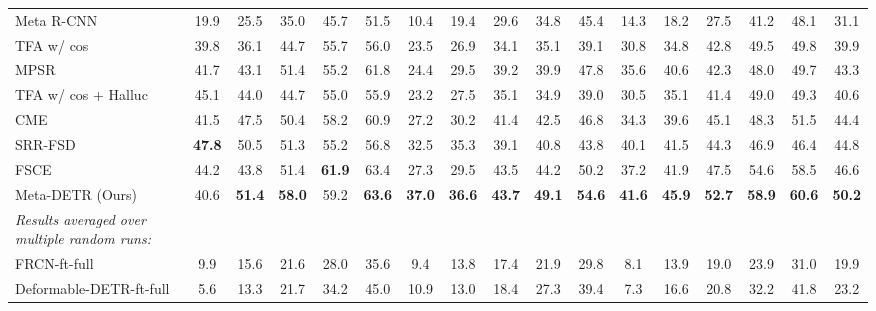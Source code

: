 \documentclass[letterpaper]{article} \usepackage{aaai22}  \usepackage{times}  \usepackage{helvet}  \usepackage{courier}  \usepackage[hyphens]{url}  \usepackage{graphicx} \urlstyle{rm} \def\UrlFont{\rm}  \usepackage{natbib}  \usepackage{caption} \DeclareCaptionStyle{ruled}{labelfont=normalfont,labelsep=colon,strut=off} \frenchspacing  \setlength{\pdfpagewidth}{8.5in}  \setlength{\pdfpageheight}{11in}  \usepackage{algorithm}
\begin{document}
\begin{table*}[t]
\begin{center}
{\begin{tabular}[t]{l|ccccc|ccccc|ccccc|c}
Meta R-CNN\;\cite{metarcnn} & 19.9 & 25.5 & 35.0 & 45.7 & 51.5 & 10.4 & 19.4 & 29.6 & 34.8 & 45.4 & 14.3 & 18.2 & 27.5 & 41.2 & 48.1 & 31.1 \\



TFA w/ cos\;\cite{fsdet}\, & 39.8 & 36.1 & 44.7 & 55.7 & 56.0 & 23.5 & 26.9 & 34.1 & 35.1 & 39.1 & 30.8 & 34.8 & 42.8 & 49.5 & 49.8 & 39.9 \\

MPSR\;\cite{MPSR}\, & 41.7 & 43.1 & 51.4 & 55.2 & 61.8 & 24.4 & 29.5 & 39.2 & 39.9 & 47.8 & 35.6 & 40.6 & 42.3 & 48.0 & 49.7 & 43.3 \\

TFA w/ cos + Halluc\;\cite{Halluc_FSD}\, & 45.1 & 44.0 & 44.7 & 55.0 & 55.9 & 23.2 & 27.5 & 35.1 & 34.9 & 39.0 & 30.5 & 35.1 & 41.4 & 49.0 & 49.3 & 40.6 \\

CME\;\cite{CME}\, & 41.5 & 47.5 & 50.4 & 58.2 & 60.9 & 27.2 & 30.2 & 41.4 & 42.5 & 46.8 & 34.3 & 39.6 & 45.1 & 48.3 & 51.5 & 44.4 \\

SRR-FSD\;\cite{SRR-FSD}\,\, & \textbf{47.8} & 50.5 & 51.3 & 55.2 & 56.8 & 32.5 & 35.3 & 39.1 & 40.8 & 43.8 & 40.1 & 41.5 & 44.3 & 46.9 & 46.4 & 44.8\\

FSCE\;\cite{fsce}\, & 44.2 & 43.8 & 51.4 & \textbf{61.9} & 63.4 & 27.3 & 29.5 & 43.5 & 44.2 & 50.2 & 37.2 & 41.9 & 47.5 & 54.6 & 58.5 & 46.6\\

\rowcolor{black!6} Meta-DETR (Ours) & 40.6 & \textbf{51.4} & \textbf{58.0} & 59.2 & \textbf{63.6} & \textbf{37.0} & \textbf{36.6} & \textbf{43.7} & \textbf{49.1} & \textbf{54.6} & \textbf{41.6} & \textbf{45.9} & \textbf{52.7} & \textbf{58.9} & \textbf{60.6} & \textbf{50.2} \\\midrule[0.68pt]

\textit{Results averaged over multiple random runs:} & & & & & & & & & & & & & & & \\

FRCN-ft-full\;\cite{FasterRCNN}\, & 9.9 & 15.6 & 21.6 & 28.0 & 35.6 & 9.4 & 13.8 & 17.4 & 21.9 & 29.8 & 8.1 & 13.9 & 19.0 & 23.9 & 31.0 & 19.9 \\

Deformable-DETR-ft-full\;\cite{DeformableDETR}\, & 5.6 & 13.3 & 21.7 & 34.2 & 45.0 & 10.9 & 13.0 & 18.4 & 27.3 & 39.4 & 7.3 & 16.6 & 20.8 & 32.2 & 41.8 & 23.2 \\




\end{tabular}}
\end{center}
\end{table*}
\end{document}
